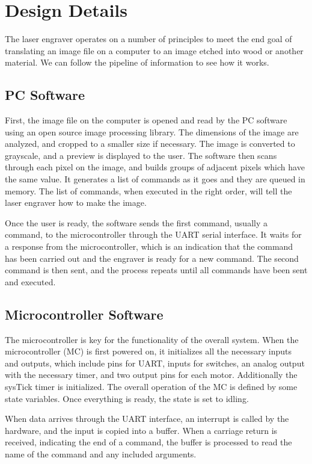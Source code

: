 \documentclass[11pt]{LaTeX-Classes/math-hw}
\begin{document}
\section{Design Details}
The laser engraver operates on a number of principles to meet the end goal of
translating an image file on a computer to an image etched into wood or another material.
We can follow the pipeline of information to see how it works.

\subsection{PC Software}
First, the image file on the computer is opened and read by the PC software using an open source
image processing library. The dimensions of the image are analyzed, and cropped to a smaller size
if necessary.
The image is converted to grayscale, and a preview is displayed to the user.
The software then scans through each pixel on the image, and builds groups of adjacent pixels
which have the same value. It generates a list of commands as it goes and they are queued in memory.
The list of commands, when executed in the right order, will tell the laser engraver how to make the image.

Once the user is ready, the software sends the first command, usually a  command, to the
microcontroller through the UART serial interface.
It waits for a response from the microcontroller, which is an indication that the command has been
carried out and the engraver is ready for a new command.
The second command is then sent, and the process repeats until all commands have been sent and executed.

\subsection{Microcontroller Software}
The microcontroller is key for the functionality of the overall system.
When the microcontroller (MC) is first powered on, it initializes all the necessary inputs and outputs,
which include pins for UART, inputs for switches, an analog output with the necessary timer,
and two output pins for each motor.
Additionally the sysTick timer is initialized. The overall operation of the MC is defined by some
state variables. Once everything is ready, the state is set to idling.

When data arrives through the UART interface, an interrupt is called by the hardware, and the
input is copied into a buffer. When a carriage return is received, indicating the end of a command,
the buffer is processed to read the name of the command and any included arguments.
\end{document}
